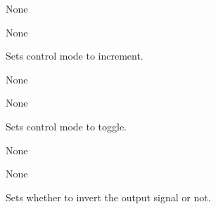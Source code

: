 \documentclass[letterpaper,10pt,english]{sphinxmanual}
\begin{document}
\begin{fulllineitems}
\begin{fulllineitems}
\sphinxAtStartPar
{}

\sphinxAtStartPar
None

\sphinxAtStartPar
{}

\sphinxAtStartPar
None

\end{fulllineitems}


\begin{fulllineitems}
\label{\detokenize{base:OutputObject.OutputObject.set_control_increment}}
\sphinxAtStartPar
Sets control mode to increment.

\sphinxAtStartPar
{}

\sphinxAtStartPar
None

\sphinxAtStartPar
{}

\sphinxAtStartPar
None

\end{fulllineitems}


\begin{fulllineitems}
\label{\detokenize{base:OutputObject.OutputObject.set_control_toggle}}
\sphinxAtStartPar
Sets control mode to toggle.

\sphinxAtStartPar
{}

\sphinxAtStartPar
None

\sphinxAtStartPar
{}

\sphinxAtStartPar
None

\end{fulllineitems}


\begin{fulllineitems}
\label{\detokenize{base:OutputObject.OutputObject.set_inversion}}
\sphinxAtStartPar
Sets whether to invert the output signal or not.


\end{fulllineitems}
\end{fulllineitems}
\end{document}
